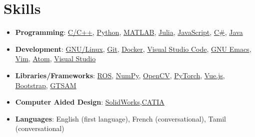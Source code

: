 \documentclass[letterpaper,11pt]{article}
\newcommand{\resumeSkillItemHeading}[2]{
  \item\small{
    \textbf{#1}{: #2 \vspace{-4pt}}
  }
}
\newcommand{\resumeItemListStart}{\begin{itemize}}
\newcommand{\resumeItemListEnd}{\end{itemize}\vspace{-4pt}}
\begin{document}







\section{Skills}
\resumeItemListStart

\resumeSkillItemHeading{Programming}
{\href{https://www.cplusplus.com/}{C/C++}, \href{https://www.python.org/}{Python}, \href{https://www.mathworks.com/products/matlab.html}{MATLAB}, \href{https://julialang.org}{Julia}, \href{https://www.javascript.com/}{JavaScript}, \href{https://docs.microsoft.com/en-us/dotnet/csharp/}{C\#}, \href{https://www.java.com/}{Java}}


\resumeSkillItemHeading{Development}
{\href{https://www.linux.org}{GNU/Linux}, \href{https://git-scm.com}{Git}, \href{https://www.docker.com}{Docker}, \href{https://code.visualstudio.com/?wt.mc_id=DX_841432}{Visual Studio Code}, \href{https://www.gnu.org/software/emacs/}{GNU Emacs}, \href{https://www.vim.org}{Vim}, \href{https://atom.io}{Atom}, \href{https://visualstudio.microsoft.com/vs/}{Visual Studio}}

\resumeSkillItemHeading{Libraries/Frameworks}
{\href{https://www.ros.org/}{ROS}, \href{https://numpy.org/}{NumPy}, \href{https://opencv.org}{OpenCV}, \href{https://pytorch.org/}{PyTorch}, \href{https://vuejs.org/}{Vue.js}, \href{https://getbootstrap.com/}{Bootstrap}, \href{https://gtsam.org/}{GTSAM}}

\resumeSkillItemHeading{Computer Aided Design}
{\href{https://www.solidworks.com/}{SolidWorks},\href{https://www.3ds.com/products-services/catia/}{CATIA}}


\resumeSkillItemHeading{Languages}
{English (first language), French (conversational), Tamil (conversational)}

\resumeItemListEnd

\end{document}
